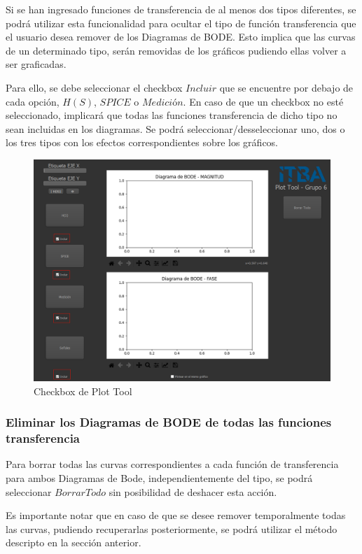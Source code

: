 Si se han ingresado funciones de transferencia de al menos dos tipos diferentes, se podrá utilizar esta funcionalidad para ocultar el tipo de función transferencia que el usuario desea remover de los Diagramas de BODE.
Esto implica que las curvas de un determinado tipo, serán removidas de los gráficos pudiendo ellas volver a ser graficadas.

Para ello, se debe seleccionar el checkbox $Incluir$ que se encuentre por debajo de cada opción, $H(S)$, $SPICE$ o $Medición$. En caso de que un checkbox no esté seleccionado, implicará que todas las funciones transferencia de dicho tipo no sean incluidas en los diagramas. 
Se podrá seleccionar/desseleccionar uno, dos o los tres tipos con los efectos correspondientes sobre los gráficos.

\begin{figure}[!htb] 
    \centering 
    \includegraphics [width=0.8
    \textwidth] {../EJ2/LatexScreenshots/plotToolVaciaCheck.png} 
    \caption{Checkbox de Plot Tool}
    \label{fig:checkBoxPlotTool}
\end{figure}



\subsubsection{Eliminar los Diagramas de BODE de todas las funciones transferencia}

Para borrar todas las curvas correspondientes a cada función de transferencia para ambos Diagramas de Bode, independientemente del tipo, se podrá seleccionar $Borrar Todo$ sin posibilidad de deshacer esta acción. 

Es importante notar que en caso de que se desee remover temporalmente todas las curvas, pudiendo recuperarlas posteriormente, se podrá utilizar el método descripto en la sección anterior.

